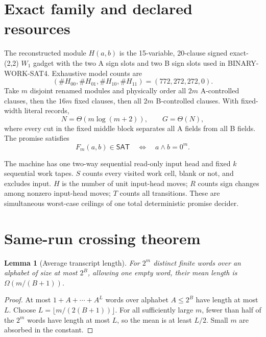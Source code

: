 \documentclass[11pt]{article}
\newtheorem{lemma}[theorem]{Lemma}
\newcommand{\SAT}{\mathsf{SAT}}
\begin{document}
\section{Exact family and declared resources}
The reconstructed module \(H(a,b)\) is the 15-variable, 20-clause signed exact-(2,2) \(W_1\) gadget with the two A sign slots and two B sign slots used in BINARY-WORK-SAT4. Exhaustive model counts are
\[
(\#H_{00},\#H_{01},\#H_{10},\#H_{11})=(772,272,272,0).
\]
Take \(m\) disjoint renamed modules and physically order all \(2m\) A-controlled clauses, then the \(16m\) fixed clauses, then all \(2m\) B-controlled clauses. With fixed-width literal records,
\[
N=\Theta(m\log(m+2)),\qquad G=\Theta(N),
\]
where every cut in the fixed middle block separates all A fields from all B fields. The promise satisfies
\[
F_m(a,b)\in\SAT\quad\Longleftrightarrow\quad a\wedge b=0^m. \tag{1}
\]

The machine has one two-way sequential read-only input head and fixed \(k\) sequential work tapes. \(S\) counts every visited work cell, blank or not, and excludes input. \(H\) is the number of unit input-head moves; \(R\) counts sign changes among nonzero input-head moves; \(T\) counts all transitions. These are simultaneous worst-case ceilings of one total deterministic promise decider.

\section{Same-run crossing theorem}
\begin{lemma}[Average transcript length]
For \(2^m\) distinct finite words over an alphabet of size at most \(2^B\), allowing one empty word, their mean length is \(\Omega(m/(B+1))\).
\end{lemma}
\begin{proof}
At most \(1+A+\cdots+A^L\) words over alphabet \(A\le2^B\) have length at most \(L\). Choose \(L=\lfloor m/(2(B+1))\rfloor\). For all sufficiently large \(m\), fewer than half of the \(2^m\) words have length at most \(L\), so the mean is at least \(L/2\). Small \(m\) are absorbed in the constant.
\end{proof}
\end{document}
